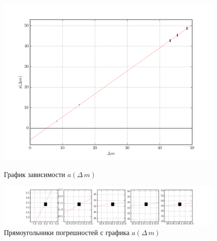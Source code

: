 \documentclass[a4paper,12pt]{report}
\begin{document}
\begin{figure}[h]
\begin{minipage}[h]{1\linewidth}
	\begin{center}
	\includegraphics*[width=1\textwidth]{img/ex_22.png}
	\caption{\label{fig:a-m}График зависимости $a(\Delta\,m)$}
	\end{center}
\end{minipage}
\vfill
\begin{minipage}[h]{1\linewidth}
	\begin{center}
	\includegraphics*[width=1\textwidth]{img/ex_2-5.png}
	\caption{\label{fig:a-m-2}Прямоугольники погрешностей с графика $a(\Delta\,m)$}
	\end{center}
\end{minipage}

\end{figure} 
\end{document}
